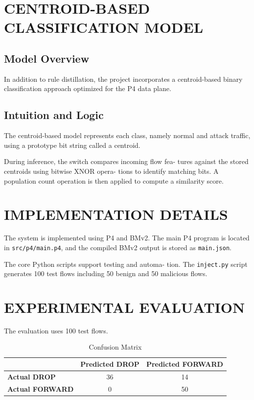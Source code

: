 \documentclass[conference]{IEEEtran}
\begin{document}
\section{CENTROID-BASED CLASSIFICATION MODEL}

\subsection{Model Overview}

In addition to rule distillation, the project incorporates a
centroid-based binary classification approach optimized for the
P4 data plane.

\subsection{Intuition and Logic}

The centroid-based model represents each class, namely
normal and attack traffic, using a prototype bit string called
a centroid.

During inference, the switch compares incoming flow fea-
tures against the stored centroids using bitwise XNOR opera-
tions to identify matching bits. A population count operation
is then applied to compute a similarity score.

\section{IMPLEMENTATION DETAILS}

The system is implemented using P4 and BMv2. The
main P4 program is located in \texttt{src/p4/main.p4}, and the
compiled BMv2 output is stored as \texttt{main.json}.

The core Python scripts support testing and automa-
tion. The \texttt{inject.py} script generates 100 test flows
including 50 benign and 50 malicious flows.

\section{EXPERIMENTAL EVALUATION}

The evaluation uses 100 test flows.

\begin{table}[H]
\caption{Confusion Matrix}
\label{tab:confusion_matrix}
\centering
\begin{tabular}{lcc}
\toprule
 & \textbf{Predicted DROP} & \textbf{Predicted FORWARD} \\
\midrule
\textbf{Actual DROP} & 36 & 14 \\
\textbf{Actual FORWARD} & 0 & 50 \\
\bottomrule
\end{tabular}
\end{table}
\end{document}

